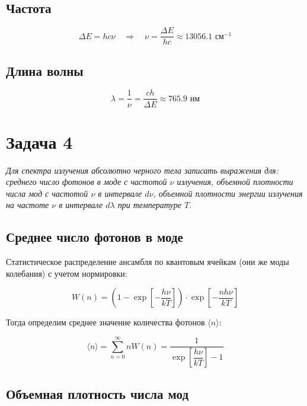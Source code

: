 \documentclass[a4paper, 12pt]{article}
\newcommand{\qrq}
{\ensuremath{\quad \Rightarrow \quad}} %
\newcommand{\med}[1]
{\ensuremath{\langle#1\rangle}}
\begin{document}
\subsection{Частота}

\begin{equation}
	\Delta E = h c \nu \qrq \nu = \frac{\Delta E}{h c} \approx 13056.1 \text{ см$^{-1}$}
\end{equation}

\subsection{Длина волны}

\begin{equation}
	\lambda = \frac{1}{\nu} = \frac{c h}{\Delta E} \approx 765.9 \text{ нм} 
\end{equation}

\section{Задача 4}

\textit{Для спектра излучения абсолютно черного тела записать выражения для: среднего число фотонов в моде с частотой $\nu$ излучения, объемной плотности числа мод с частотой $\nu$ в интервале $d\nu$, объемной плотности энергии излучения на частоте $\nu$ в интервале $d\lambda$ при температуре $T$}.

\subsection{Среднее число фотонов в моде}

Статистическое распределение ансамбля по квантовым ячейкам (они же моды колебания) с учетом нормировки:

\begin{equation}
	W(n) = \left(1 - \exp \left[-\frac{h \nu}{k T}\right]\right) \cdot \exp \left[-\frac{n h \nu}{k T}\right]
\end{equation}

Тогда определим среднее значение количества фотонов $\med{n}$:

\begin{equation}
	\med{n} = \sum\limits_{n=0}^\infty n W(n) = \frac{1}{\exp\left[\dfrac{h \nu}{k T}\right] - 1}
\end{equation}

\subsection{Объемная плотность числа мод}
\end{document}
